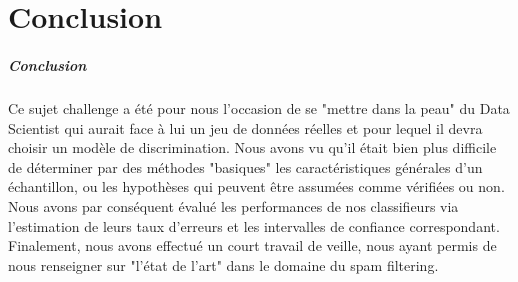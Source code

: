 \documentclass{report}
\begin{document}
\chapter{Conclusion}

\paragraph{Conclusion}
Ce sujet challenge a été pour nous l'occasion de se "mettre dans la peau" du Data Scientist qui aurait face à lui un jeu de données réelles et pour lequel il devra choisir un modèle de discrimination. Nous avons vu qu'il était bien plus difficile de déterminer par des méthodes "basiques" les caractéristiques générales d'un échantillon, ou les hypothèses qui peuvent être assumées comme vérifiées ou non. Nous avons par conséquent évalué les performances de nos classifieurs via l'estimation de leurs taux d'erreurs et les intervalles de confiance correspondant. Finalement, nous avons effectué un court travail de veille, nous ayant permis de nous renseigner sur "l'état de l'art" dans le domaine du spam filtering.
\end{document}
